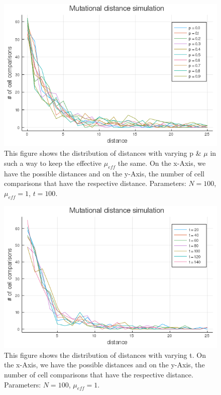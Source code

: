 \documentclass{article}
\numberwithin{equation}{subsection}
\begin{document}
	\begin{figure}[h!]
		\centering
		\includegraphics[width=\linewidth]{distance_N100_mu1.png}
		
		\caption{This figure shows the distribution of distances with varying p \& $\mu$ in such a way to keep the effective $ \mu_{eff} $ the same. On the x-Axis, we have the possible distances and on the y-Axis, the number of cell comparisons that have the respective distance. Parameters: $ N = 100$, $\mu_{eff} = 1 $, $ t = 100$.}
		\label{fig::PDist}
	\end{figure}
	
	\begin{figure}[h!]
		\centering
		\includegraphics[width=\linewidth]{phyldistanceAll_N100.png}
		
		\caption{This figure shows the distribution of distances with varying t. On the x-Axis, we have the possible distances and on the y-Axis, the number of cell comparisons that have the respective distance. Parameters: $ N = 100$, $\mu_{eff} = 1 $.}
		\label{fig::TDist}
	\end{figure}
\end{document}
